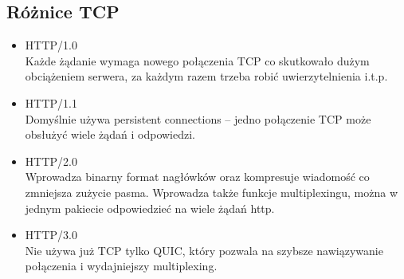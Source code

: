 \subsection{Różnice TCP}
\begin{itemize}
  \item HTTP/1.0 \\
    Każde żądanie wymaga nowego połączenia TCP co skutkowało dużym obciążeniem serwera, za każdym razem trzeba robić uwierzytelnienia i.t.p. 
  \item HTTP/1.1 \\
    Domyślnie używa persistent connections – jedno połączenie TCP może obsłużyć wiele żądań i odpowiedzi. 
  \item HTTP/2.0 \\
    Wprowadza binarny format nagłówków oraz kompresuje wiadomość co zmniejsza zużycie pasma. Wprowadza także funkcje multiplexingu, można w jednym pakiecie odpowiedzieć na wiele żądań http. 
  \item HTTP/3.0 \\
    Nie używa już TCP tylko QUIC, który pozwala na szybsze nawiązywanie połączenia i wydajniejszy multiplexing.
\end{itemize}
